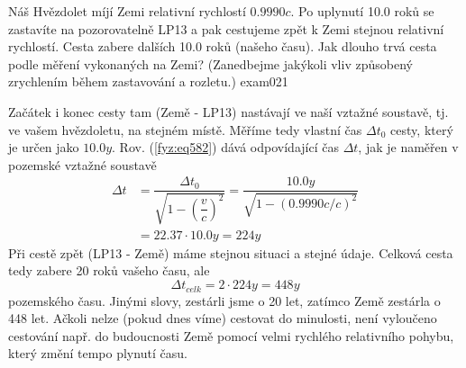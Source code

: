 \begin{fyzexam}{Náš Hvězdolet míjí Zemi relativní rychlostí \(\num{0.999 0}c\). Po uplynutí
  \num{10.0} roků se zastavíte na pozorovatelně LP13 a pak cestujeme zpět k Zemi stejnou relativní
  rychlostí. Cesta zabere dalších \num{10.0} roků (našeho času). Jak dlouho trvá cesta podle měření
  vykonaných na Zemi? (Zanedbejme jakýkoli vliv způsobený zrychlením během zastavování a rozletu.)
  \cite[s.~1013]{Halliday2001}}{exam021} 
   
  \vspace{1em}
  Začátek i konec cesty tam (Země - LP13) nastávají ve naší vztažné soustavě, tj. ve vašem
  hvězdoletu, na stejném místě. Měříme tedy vlastní čas \(\Delta t_0\) cesty, který je určen jako
  \(\num{10.0} y\). Rov. (\ref{fyz:eq582}) dává odpovídající čas \(\Delta t\), jak je naměřen v
  pozemské vztažné soustavě
  \begin{align*}
    \Delta t &= \dfrac{\Delta t_0}{\sqrt{1  - \left(\dfrac{v}{c}\right)^2}}
              = \dfrac{\num{10.0} y}{\sqrt{1  - (\num{0.999 0}c/c)^2}}      \\
              &= \num{22.37}\cdot\num{10.0} y = \num{224} y
  \end{align*}
  Při cestě zpět (LP13 - Země) máme stejnou situaci a stejné údaje. Celková cesta tedy zabere 20
  roků vašeho času, ale
  \begin{equation*}
    \Delta t_{celk}  = 2\cdot\num{224} y = \num{448} y
  \end{equation*}
  pozemského času. Jinými slovy, zestárli jsme o \num{20} let, zatímco Země zestárla o \num{448}
  let. Ačkoli nelze (pokud dnes víme) cestovat do minulosti, není vyloučeno cestování např. do
  budoucnosti Země pomocí velmi rychlého relativního pohybu, který změní tempo plynutí času.
\end{fyzexam}